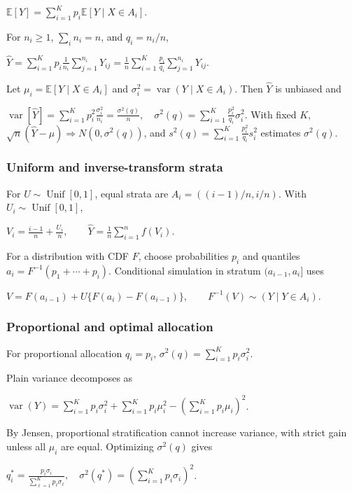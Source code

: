 $\mathbb{E}[Y]=\sum_{i=1}^Kp_i\mathbb{E}[Y\mid X\in A_i]$.

For $n_i\ge1$, $\sum_i n_i=n$, and $q_i=n_i/n$,

$\hat{Y}=\sum_{i=1}^Kp_i\frac{1}{n_i}\sum_{j=1}^{n_i}Y_{ij}=\frac{1}{n}\sum_{i=1}^K\frac{p_i}{q_i}\sum_{j=1}^{n_i}Y_{ij}$.

Let $\mu_i=\mathbb{E}[Y\mid X\in A_i]$ and $\sigma_i^2=\operatorname{var}(Y\mid X\in A_i)$. Then $\hat{Y}$ is unbiased and

$\operatorname{var}[\hat{Y}]=\sum_{i=1}^Kp_i^2\frac{\sigma_i^2}{n_i}=\frac{\sigma^2(q)}{n},\quad \sigma^2(q)=\sum_{i=1}^K\frac{p_i^2}{q_i}\sigma_i^2$.
With fixed $K$, $\sqrt{n}(\hat{Y}-\mu)\Rightarrow N(0,\sigma^2(q))$, and
$s^2(q)=\sum_{i=1}^K\frac{p_i^2}{q_i}s_i^2$
estimates $\sigma^2(q)$.

\subsubsection*{Uniform and inverse-transform strata}

For $U\sim\operatorname{Unif}[0,1]$, equal strata are $A_i=((i-1)/n,i/n)$. With $U_i\sim\operatorname{Unif}[0,1]$,

$V_i=\frac{i-1}{n}+\frac{U_i}{n},\qquad \hat{Y}=\frac{1}{n}\sum_{i=1}^nf(V_i)$.

For a distribution with CDF $F$, choose probabilities $p_i$ and quantiles $a_i=F^{-1}(p_1+\cdots+p_i)$. Conditional simulation in stratum $(a_{i-1},a_i]$ uses

$V=F(a_{i-1})+U\{F(a_i)-F(a_{i-1})\},\qquad F^{-1}(V)\sim (Y\mid Y\in A_i)$.

\subsubsection*{Proportional and optimal allocation}

For proportional allocation $q_i=p_i$,
$\sigma^2(q)=\sum_{i=1}^Kp_i\sigma_i^2$.

Plain variance decomposes as

$\operatorname{var}(Y)=\sum_{i=1}^Kp_i\sigma_i^2+\sum_{i=1}^Kp_i\mu_i^2-\left(\sum_{i=1}^Kp_i\mu_i\right)^2$.

By Jensen, proportional stratification cannot increase variance, with strict gain unless all $\mu_i$ are equal. Optimizing $\sigma^2(q)$ gives

$q_i^*=\frac{p_i\sigma_i}{\sum_{\ell=1}^Kp_\ell\sigma_\ell},\quad \sigma^2(q^*)=\left(\sum_{i=1}^Kp_i\sigma_i\right)^2$.



